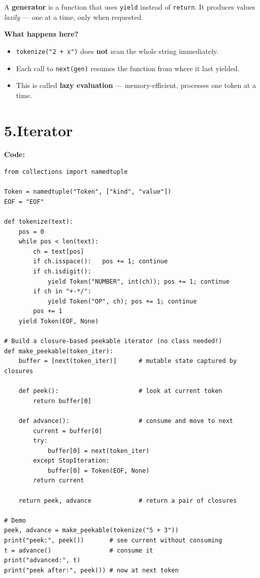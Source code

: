\documentclass[12pt, a4paper]{article}
\begin{document}
A \textbf{generator} is a function that uses \texttt{yield} instead of \texttt{return}. It produces values \textit{lazily} --- one at a time, only when requested.

\textbf{What happens here?}
\begin{itemize}
    \item \texttt{tokenize("2 + x")} does \textbf{not} scan the whole string immediately.
    \item Each call to \texttt{next(gen)} resumes the function from where it last yielded.
    \item This is called \textbf{lazy evaluation} --- memory-efficient, processes one token at a time.
\end{itemize}

\newpage
\section{5.\quad Iterator}

\textbf{Code:}

\begin{lstlisting}
from collections import namedtuple

Token = namedtuple("Token", ["kind", "value"])
EOF = "EOF"

def tokenize(text):
    pos = 0
    while pos < len(text):
        ch = text[pos]
        if ch.isspace():   pos += 1; continue
        if ch.isdigit():
            yield Token("NUMBER", int(ch)); pos += 1; continue
        if ch in "+-*/":
            yield Token("OP", ch); pos += 1; continue
        pos += 1
    yield Token(EOF, None)

# Build a closure-based peekable iterator (no class needed!)
def make_peekable(token_iter):
    buffer = [next(token_iter)]      # mutable state captured by closures

    def peek():                      # look at current token
        return buffer[0]

    def advance():                   # consume and move to next
        current = buffer[0]
        try:
            buffer[0] = next(token_iter)
        except StopIteration:
            buffer[0] = Token(EOF, None)
        return current

    return peek, advance             # return a pair of closures

# Demo
peek, advance = make_peekable(tokenize("5 + 3"))
print("peek:", peek())       # see current without consuming
t = advance()                # consume it
print("advanced:", t)
print("peek after:", peek()) # now at next token
\end{lstlisting}
\end{document}
